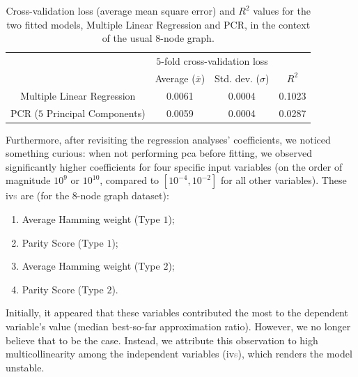 \begin{table}[H]
  \centering
  \begin{tabular}{|c|cc|c|}
  \hline
  \rowcolor[HTML]{FFFFFF} 
  \cellcolor[HTML]{FFFFFF}                               & \multicolumn{2}{c|}{\cellcolor[HTML]{FFFFFF}$5$-fold cross-validation loss} & \cellcolor[HTML]{FFFFFF} \\ \cline{2-3}
  \rowcolor[HTML]{FFFFFF} 
  \multirow{-2}{*}{\cellcolor[HTML]{FFFFFF}Model ($8$-node graph)} &
    \multicolumn{1}{c|}{\cellcolor[HTML]{FFFFFF}Average ($\overline{x}$)} &
    Std. dev. ($\sigma$) &
    \multirow{-2}{*}{\cellcolor[HTML]{FFFFFF}$R^2$} \\ \hline
  \rowcolor[HTML]{EFEFEF} 
  \cellcolor[HTML]{FFFFFF}Multiple Linear Regression     & \multicolumn{1}{c|}{\cellcolor[HTML]{EFEFEF}0.0061}         & 0.0004        & 0.1023                   \\ \hline
  \rowcolor[HTML]{EFEFEF} 
  \cellcolor[HTML]{FFFFFF}PCR ($5$ Principal Components) & \multicolumn{1}{c|}{\cellcolor[HTML]{EFEFEF}0.0059}         & 0.0004        & 0.0287                   \\ \hline
  \end{tabular}
  \caption{Cross-validation loss (average mean square error) and $R^2$ values for the two fitted models, Multiple Linear Regression and PCR, in the context of the usual $8$-node graph.}
  \label{tab:Scaled_Median_BSF_Table_8-node}
\end{table}

Furthermore, after revisiting the regression analyses' coefficients, we noticed something curious: when not performing \acrshort{pca} before fitting, we observed significantly higher coefficients for four specific input variables (on the order of magnitude \(10^9\) or \(10^{10}\), compared to \([10^{-4}, 10^{-2}]\) for all other variables). These \acrshort{iv}\textcolor{gray}{s} are (for the $8$-node graph dataset):
\begin{enumerate}
    \item Average Hamming weight (Type $1$);
    \item Parity Score (Type $1$);
    \item Average Hamming weight (Type $2$);
    \item Parity Score (Type $2$).
\end{enumerate}
Initially, it appeared that these variables contributed the most to the dependent variable's value (median best-so-far approximation ratio). However, we no longer believe that to be the case. Instead, we attribute this observation to high multicollinearity among the independent variables (\acrshort{iv}\textcolor{gray}{s}), which renders the model unstable.

